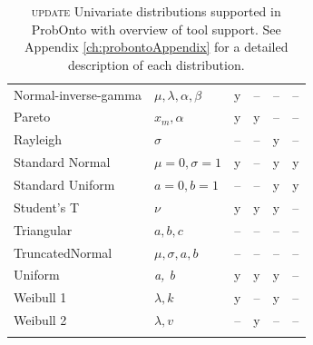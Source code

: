 {\begin{center}
\begin{longtable}{l | lcccc}
Normal-inverse-gamma	& $\mu, \lambda, \alpha, \beta$	& y	& --  & --  &  -- \\
Pareto				& $x_m, \alpha$	& y	& y	& --  &  -- \\
Rayleigh				& $\sigma$		& --  & --  & y	&  -- \\
Standard Normal 		& $\mu\!=\!0, \sigma\!=\!1$	& y & -- &	 y & y  \\
Standard Uniform		& $a\!=\!0, b\!=\!1$		& --	& --	& y & y  \\
Student's T			& $\nu$			& y	& y	& y	&  -- \\
Triangular				& $a, b, c$		& -- 	& --	& -- & -- \\
TruncatedNormal		& $\mu, \sigma, a, b$ & --	& --  & -- & -- \\
Uniform				&  \emph{a, b}		& y	& y	& y		& --  \\
Weibull 1				& $\lambda, k$		& y	& --	& y	&  -- \\
Weibull 2				& $\lambda, v$		& --	& y	& --	&  -- \\
   \hline 
\caption{{\color{red} \scshape{update}} Univariate distributions supported in ProbOnto with overview of tool support. 
See Appendix \ref{ch:probontoAppendix} for a detailed description of each distribution.}
\label{figTable:univariates}
\vspace{-2.5em}
\end{longtable}
\end{center}


}

